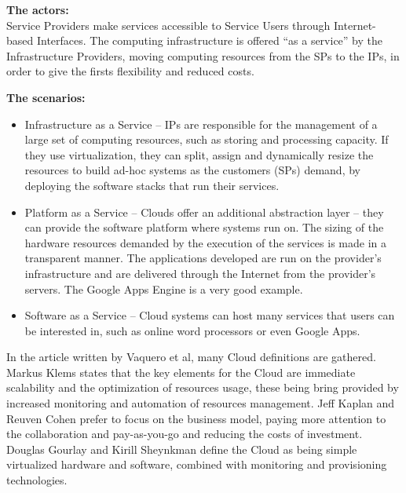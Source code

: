 
\textbf{The actors:}\\
Service Providers make services accessible to Service Users through Internet-based Interfaces. The computing infrastructure is offered “as a service” by the Infrastructure Providers, moving computing resources from the SPs to the IPs, in order to give the firsts flexibility and reduced costs.

\textbf{The scenarios:}
\begin{itemize}
\item Infrastructure as a Service – IPs are responsible for the management of a large set of computing resources, such as storing and processing capacity. If they use virtualization, they can split, assign and dynamically resize the resources to build ad-hoc systems as the customers (SPs) demand, by deploying the software stacks that run their services.
\item Platform as a Service – Clouds offer an additional abstraction layer – they can provide the software platform where systems run on. The sizing of the hardware resources demanded by the execution of the services is made in a transparent manner. The applications developed are run on the provider's infrastructure and are delivered through the Internet from the provider's servers. The Google Apps Engine is a very good example.
\item Software as a Service – Cloud systems can host many services that users can be interested in, such as online word processors or even Google Apps. \cite{knorr,vaquero}
\end{itemize}

In the article written by Vaquero et al, many Cloud definitions are gathered. Markus Klems states that the key elements for the Cloud are immediate scalability and the optimization of resources usage, these being bring provided by increased monitoring and automation of resources management. Jeff Kaplan and Reuven Cohen prefer to focus on the business model, paying more attention to the collaboration and pay-as-you-go and reducing the costs of investment. Douglas Gourlay and Kirill Sheynkman define the Cloud as being simple virtualized hardware and software, combined with monitoring and provisioning technologies. \cite{21experts,vaquero}

